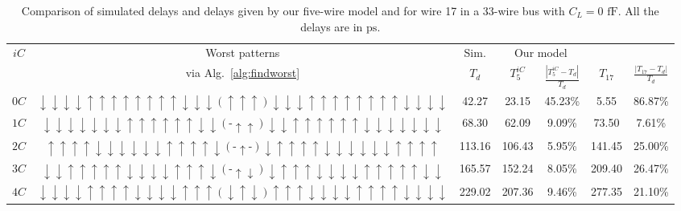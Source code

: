 \documentclass[10pt,journal]{IEEEtran}
\begin{document}
\begin{table*}
\caption{Comparison of simulated delays and delays given by our five-wire model and \cite{Sot01} for wire 17 in a 33-wire bus with $C_L = 0$ $\mathrm{fF}$. All the delays are in $\mathrm{ps}$.}\label{tab:6}
\begin{center}
\begin{tabular}{|c|c|c|c|c|c|c|}
\hline
\multirow{2}{*}{$iC$} & Worst patterns & Sim. & \multicolumn{2}{c|}{Our model} & \multicolumn{2}{c|}{\cite{Sot01}} \\
\cline{3-7}
& via Alg.~\ref{alg:findworst} & $T_d$ & $T^{iC}_5$ & $\frac{|T^{iC}_5-T_d|}{T_d}$ & $T_{17}$ &  $\frac{|T_{17}-T_d|}{T_d}$ \\
\hline
$0C$ & $\downarrow \downarrow \downarrow \downarrow \uparrow \uparrow \uparrow \uparrow \uparrow \uparrow \uparrow \uparrow \downarrow \downarrow \downarrow (\uparrow \uparrow \uparrow) \downarrow \downarrow \downarrow \uparrow \uparrow \uparrow \uparrow \uparrow \uparrow \uparrow \uparrow \downarrow \downarrow  \downarrow \downarrow$ & 42.27 &  23.15 & 45.23\% & 5.55  & 86.87\% \\
\hline
$1C$ & $\downarrow \downarrow \downarrow \downarrow \downarrow \downarrow \downarrow \uparrow \uparrow \uparrow \uparrow \uparrow \uparrow \downarrow \downarrow (\mbox{-}\uparrow\uparrow) \downarrow \downarrow \uparrow \uparrow \uparrow \uparrow \uparrow \uparrow \downarrow \downarrow \downarrow \downarrow \downarrow \downarrow \downarrow$ & 68.30 & 62.09 & 9.09\% & 73.50  & 7.61\% \\
\hline
$2C$ & $\uparrow \uparrow \uparrow \uparrow \downarrow \downarrow \downarrow \downarrow \downarrow \downarrow \uparrow \uparrow \uparrow \uparrow \downarrow (\mbox{-} \uparrow \mbox{-}) \downarrow \uparrow \uparrow \uparrow \uparrow \downarrow \downarrow \downarrow \downarrow \downarrow \downarrow \uparrow \uparrow \uparrow \uparrow$ & 113.16 & 106.43 &  5.95\% & 141.45 & 25.00\% \\
\hline
$3C$ & $\downarrow \downarrow \uparrow \uparrow \uparrow \uparrow  \uparrow \downarrow \downarrow \downarrow \downarrow \uparrow \uparrow \uparrow \downarrow (\mbox{-} \uparrow \downarrow) \downarrow \uparrow \uparrow \uparrow \downarrow \downarrow \downarrow \downarrow \uparrow  \uparrow \uparrow \uparrow \uparrow \downarrow \downarrow$ & 165.57 & 152.24 &  8.05\% & 209.40 & 26.47\% \\
\hline
$4C$ & $\downarrow \downarrow \downarrow\downarrow \uparrow \uparrow \uparrow \uparrow \downarrow \downarrow \downarrow \downarrow \uparrow \uparrow \uparrow (\downarrow \uparrow \downarrow) \uparrow \uparrow \uparrow \downarrow \downarrow \downarrow \downarrow \uparrow \uparrow \uparrow \uparrow \downarrow \downarrow \downarrow \downarrow$  & 229.02 & 207.36 & 9.46\% & 277.35 & 21.10\% \\
\hline
\end{tabular}
\end{center}
\end{table*}
\end{document}
